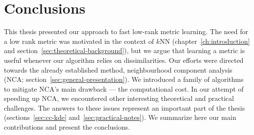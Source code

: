 \chapter{Conclusions}
\label{ch:conclusions}

This thesis presented our approach to fast low-rank metric learning. The need for a low rank metric was motivated in the context of $k$NN (chapter~\ref{ch:introduction} and section~\ref{sec:theoretical-background}), but we argue that learning a metric is useful whenever our algorithm relies on dissimilarities. Our efforts were directed towards the already established method, neighbourhood component analysis (NCA; section~\ref{sec:general-presentation}). We introduced a family of algorithms to mitigate NCA's main drawback --- the computational cost. In our attempt of speeding up NCA, we encountered other interesting theoretical and practical challenges. The answers to these issues represent an important part of the thesis (sections~\ref{sec:cc-kde} and~\ref{sec:practical-notes}). We summarize here our main contributions and present the conclusions.
